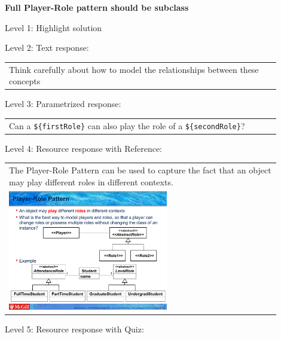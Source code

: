 \noindent \textbf{Full Player-Role pattern should be subclass} \medskip

\noindent Level 1: Highlight solution \medskip

\noindent Level 2: Text response: \medskip

\begin{tabular}{|p{0.9\linewidth}}
Think carefully about how to model the relationships between these concepts
\end{tabular} \medskip

\noindent Level 3: Parametrized response: \medskip

\begin{tabular}{|p{0.9\linewidth}}
Can a \verb|${firstRole}| can also play the role of a \verb|${secondRole}|?
\end{tabular} \medskip

\noindent Level 4: Resource response with Reference: \medskip

\begin{tabular}{|p{0.9\linewidth}}
The Player-Role Pattern can be used to capture the fact that an object may play different roles
in different contexts.

\\
\includegraphics[width=0.6\textwidth]{images/player_role.png}
\end{tabular} \medskip

\noindent Level 5: Resource response with Quiz: \medskip



